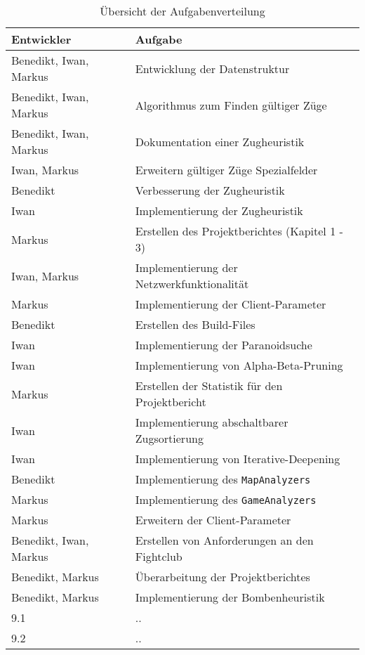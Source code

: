 \vspace{1em}
\begin{table}[!h]
    \centering
    \begin{tabular}{|l|l|}
        \hline
        \textbf{Entwickler} & \textbf{Aufgabe} \\
        \hline
        Benedikt, Iwan, Markus & Entwicklung der Datenstruktur\\
        \hline
        Benedikt, Iwan, Markus & Algorithmus zum Finden g\"ultiger Z\"uge \\
        \hline
        Benedikt, Iwan, Markus & Dokumentation einer Zugheuristik \\
        \hline
        Iwan, Markus & Erweitern g\"ultiger Z\"uge Spezialfelder  \\
        \hline
        Benedikt & Verbesserung der Zugheuristik \\
        \hline
        Iwan & Implementierung der Zugheuristik \\
        \hline
        Markus & Erstellen des Projektberichtes (Kapitel 1 - 3) \\
        \hline
        Iwan, Markus & Implementierung der Netzwerkfunktionalit\"at \\
        \hline
        Markus & Implementierung der Client-Parameter \\
        \hline
        Benedikt & Erstellen des Build-Files \\
        \hline
        Iwan & Implementierung der Paranoidsuche \\
        \hline
        Iwan & Implementierung von Alpha-Beta-Pruning \\
        \hline
        Markus & Erstellen der Statistik f\"ur den Projektbericht \\
        \hline
        Iwan & Implementierung abschaltbarer Zugsortierung \\
        \hline
        Iwan & Implementierung von Iterative-Deepening \\
        \hline
        Benedikt & Implementierung des \texttt{MapAnalyzers} \\
        \hline
        Markus & Implementierung des \texttt{GameAnalyzers} \\
        \hline
        Markus & Erweitern der Client-Parameter \\
        \hline
        Benedikt, Iwan, Markus & Erstellen von Anforderungen an den Fightclub \\
        \hline
        Benedikt, Markus & \"Uberarbeitung der Projektberichtes \\
        \hline
        Benedikt, Markus & Implementierung der Bombenheuristik \\
        \hline
        9.1 & .. \\
        \hline
        9.2 & .. \\
        \hline
    \end{tabular}
    \caption{Übersicht der Aufgabenverteilung}
    \label{tab:arbeitsverteilung}
\end{table}

